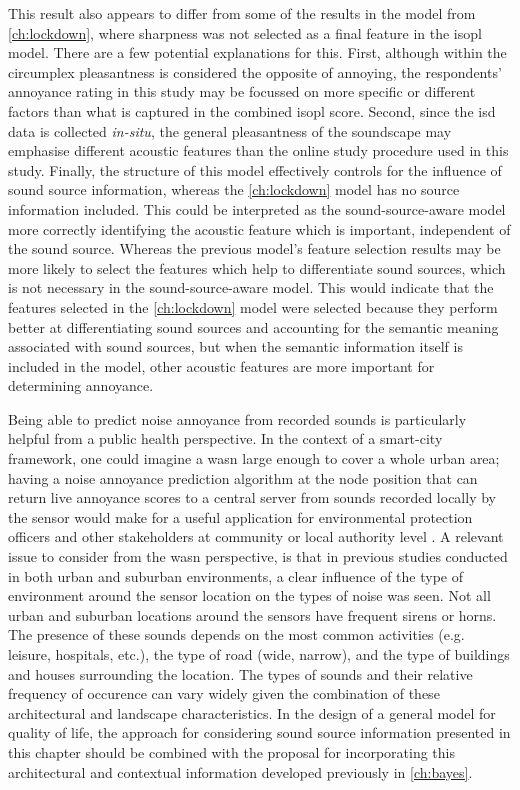 This result also appears to differ from some of the results in the model from \cref{ch:lockdown}, where sharpness was not selected as a final feature in the \gls{isopl} model. There are a few potential explanations for this. First, although within the circumplex pleasantness is considered the opposite of annoying, the respondents' annoyance rating in this study may be focussed on more specific or different factors than what is captured in the combined \gls{isopl} score. Second, since the \gls{isd} data is collected \emph{in-situ}, the general pleasantness of the soundscape may emphasise different acoustic features than the online study procedure used in this study. Finally, the structure of this model effectively controls for the influence of sound source information, whereas the \cref{ch:lockdown} model has no source information included. This could be interpreted as the sound-source-aware model more correctly identifying the acoustic feature which is important, independent of the sound source. Whereas the previous model's feature selection results may be more likely to select the features which help to differentiate sound sources, which is not necessary in the sound-source-aware model. This would indicate that the features selected in the \cref{ch:lockdown} model were selected because they perform better at differentiating sound sources and accounting for the semantic meaning associated with sound sources, but when the semantic information itself is included in the model, other acoustic features are more important for determining annoyance. 

Being able to predict noise annoyance from recorded sounds is particularly helpful from a public health perspective. In the context of a smart-city framework, one could imagine a \gls{wasn} large enough to cover a whole urban area; having a noise annoyance prediction algorithm at the node position that can return live annoyance scores to a central server from sounds recorded locally by the sensor would make for a useful application for environmental protection officers and other stakeholders at community or local authority level \citep{Kang2018Impact}. A relevant issue to consider from the \gls{wasn} perspective, is that in previous studies conducted in both urban \citep{Alias2020WASN} and suburban \citep{Alias2020Aggregate} environments, a clear influence of the type of environment around the sensor location on the types of noise was seen. Not all urban and suburban locations around the sensors have frequent sirens or horns. The presence of these sounds depends on the most common activities (e.g. leisure, hospitals, etc.), the type of road (wide, narrow), and the type of buildings and houses surrounding the location. The types of sounds and their relative frequency of occurence can vary widely given the combination of these architectural and landscape characteristics. In the design of a general model for quality of life, the approach for considering sound source information presented in this chapter should be combined with the proposal for incorporating this architectural and contextual information developed previously in \cref{ch:bayes}.

